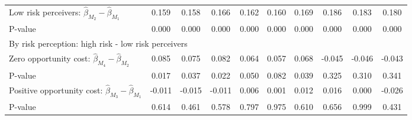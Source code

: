 \begin{tabular}{l*{9}{c}}
\quad Low risk perceivers: $\hat\beta_{M_2} - \hat\beta_{M_1}$&       0.159         &       0.158         &       0.166         &       0.162         &       0.160         &       0.169         &       0.186         &       0.183         &       0.180         \\
\quad P-value       &       0.000         &       0.000         &       0.000         &       0.000         &       0.000         &       0.000         &       0.000         &       0.000         &       0.000         \\
\multicolumn{10}{l}{By risk perception: high risk - low risk perceivers} \\ \quad Zero opportunity cost: $\hat\beta_{M_4} - \hat\beta_{M_2}$&       0.085         &       0.075         &       0.082         &       0.064         &       0.057         &       0.068         &      -0.045         &      -0.046         &      -0.043         \\
\quad P-value       &       0.017         &       0.037         &       0.022         &       0.050         &       0.082         &       0.039         &       0.325         &       0.310         &       0.341         \\
\quad Positive opportunity cost: $\hat\beta_{M_3} - \hat\beta_{M_1}$&      -0.011         &      -0.015         &      -0.011         &       0.006         &       0.001         &       0.012         &       0.016         &       0.000         &      -0.026         \\
\quad P-value       &       0.614         &       0.461         &       0.578         &       0.797         &       0.975         &       0.610         &       0.656         &       0.999         &       0.431         \\
\hline\hline \end{tabular}
